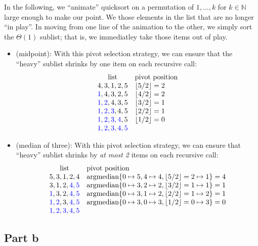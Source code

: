 \documentclass[a4paper]{article}
\newcommand*{\floor}[1]{\left\lfloor{#1}\right\rfloor}
\newcommand{\NN}{\mathbb{N}}
\begin{document}
In the following, we ``animate'' quicksort on a permutation of $1, \dots, k$ for $k \in \NN$ large enough to make our point.
We  those elements in the list that are no longer ``in play''.
In moving from one line of the animation to the other, we simply sort the $\Theta(1)$ sublist; that is, we immediatley take those items out of play.
\begin{itemize}

	\item
	(midpoint):
	With this pivot selection strategy, we can ensure that the ``heavy'' sublist shrinks by one item on each recursive call:
	\[
		\begin{array}{cl}
		\text{list} & \text{pivot position} \\
		4, 3, 1, 2, 5	& \floor{5/2} = 2 \\
		\USED{1}, 4, 3, 2, 5	&\floor{4/2} = 2 \\
		\USED{1, 2}, 4, 3, 5	&\floor{3/2} = 1 \\
		\USED{1, 2, 3}, 4, 5	&\floor{2/2} = 1 \\
		\USED{1, 2, 3, 4}, 5	&\floor{1/2} = 0 \\
		\USED{1, 2, 3, 4, 5}
		\end{array}
	\]
	
	\item
	(median of three):
	With this pivot selection strategy, we can ensure that ``heavy'' sublist shrinks by \emph{at most 2} items on each recursive call:
	\[
		\begin{array}{cl}
		\text{list} & \text{pivot position} \\
		5, 3, 1, 2, 4	&\argmedian\set{ 0\mapsto 5, 4 \mapsto 4, \floor{5/2}=2\mapsto 1} = 4 \\
		3, 1, 2, \USED{4, 5}	&\argmedian\set{0 \mapsto 3, 2 \mapsto 2, \floor{3/2}=1 \mapsto 1} = 1 \\
		\USED{1}, 3, 2, \USED{4, 5} & \argmedian\set{0 \mapsto 3, 1 \mapsto 2, \floor{2/2}=1 \mapsto 2} = 1 \\
		\USED{1, 2}, 3, \USED{4, 5} & \argmedian\set{0 \mapsto 3, 0 \mapsto 3, \floor{1/2}=0 \mapsto 3} = 0 \\
		\USED{1, 2, 3, 4, 5}
		\end{array}
	\]

\end{itemize}

\subsection{Part b}
\end{document}
